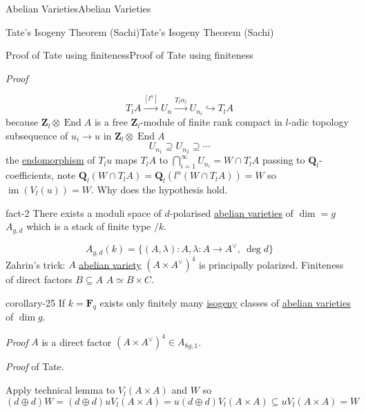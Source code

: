 \documentclass[10pt,]{book}
\makeatletter
\renewcommand*{\proofname}{Proof}
\renewenvironment{proof}[1][\proofname]{\par
  \pushQED{\qed}%
  \normalfont \topsep6\p@\@plus6\p@\relax
  \trivlist
  \item\relax
    {\itshape
    #1\@addpunct{.}}\hspace\labelsep\ignorespaces
}{%
  \popQED\endtrivlist\@endpefalse
}
\numberwithin{equation}{section}
\newcommand{\ZZ}{\mathbf{Z}}
\newcommand{\QQ}{\mathbf{Q}}
\newcommand{\FF}{\mathbf{F}}
\DeclareMathOperator{\End}{End}
\DeclareMathOperator{\image}{im}
\makeatother
\begin{document}
\begin{chapterptx}{Abelian Varieties}{}{Abelian Varieties}{}{}
\begin{sectionptx}{Tate's Isogeny Theorem (Sachi)}{}{Tate's Isogeny Theorem (Sachi)}{}{}
\begin{subsectionptx}{Proof of Tate using finiteness}{}{Proof of Tate using finiteness}{}{}
\begin{proof}
\begin{equation*}
T_l A \xrightarrow{[l^n]} U_n \xrightarrow{T_l\alpha_i} U_{n_i} \hookrightarrow T_l A
\end{equation*}
because \(\ZZ_l \otimes \End A\) is a free \(\ZZ_l\)-module of finite rank compact in \(l\)-adic topology subsequence of \(u_i \to u\) in \(\ZZ_l \otimes \End A\)%
\begin{equation*}
U_{n_1} \supseteq U_{n_2} \supseteq \cdots
\end{equation*}
the \hyperref[def-supersing-isog-endo]{endomorphism} of \(T_l u\) maps \(T_l A\) to \(\bigcap_{i=1}^\infty U_{n_i} = W\cap T_l A\) passing to \(\QQ_l\)-coefficients, note \(\QQ_l(W\cap T_l A) = \QQ_l(l^n(W\cap T_l A)) = W\) so \(\image(V_l(u)) =W\).%
\end{proof}
\hypertarget{p-395}{}%
Why does the hypothesis hold.%
\begin{fact}{}{}{fact-2}%
\hypertarget{p-396}{}%
There exists a moduli space of \(d\)-polarised \hyperref[def-buntes-abvar]{abelian varieties} of \(\dim = g\) \(A_{g,d}\) which is a stack of finite type \(/k\).%
\end{fact}
\hypertarget{p-397}{}%
%
\begin{equation*}
A_{g,d}( k) = \{(A,\lambda) : A , \lambda \colon A \to A^\vee,\ \deg d \}
\end{equation*}
Zahrin's trick: \(A\) \hyperref[def-buntes-abvar]{abelian variety} \((A\times A^\vee)^4\) is principally polarized. Finiteness of direct factors \(B\subseteq A\) \(A\simeq B\times C\).%
\begin{corollary}{}{}{corollary-25}%
\hypertarget{p-398}{}%
If \(k = \FF_q\) exists only finitely many \hyperref[def-supersing-isog-isog]{isogeny} classes of \hyperref[def-buntes-abvar]{abelian varieties} of \(\dim g\).%
\end{corollary}
\begin{proof}\hypertarget{proof-68}{}
\hypertarget{p-399}{}%
\(A\) is a direct factor \((A\times A^\vee)^4 \in A_{8g,1}\).%
\end{proof}
\begin{proof}\hypertarget{proof-69}{}
\hypertarget{p-400}{}%
of Tate.%
\par
\hypertarget{p-401}{}%
Apply technical lemma to \(V_l(A\times A)\) and \(W\) so%
\begin{equation*}
(d\oplus d) W = (d \oplus d) uV_l(A\times A) = u(d\oplus d) V_l(A\times A) \subseteq uV_l(A\times A) = W
\end{equation*}
%
\begin{equation*}

\end{equation*}
\end{proof}
\end{subsectionptx}
\end{sectionptx}
\end{chapterptx}
\end{document}
